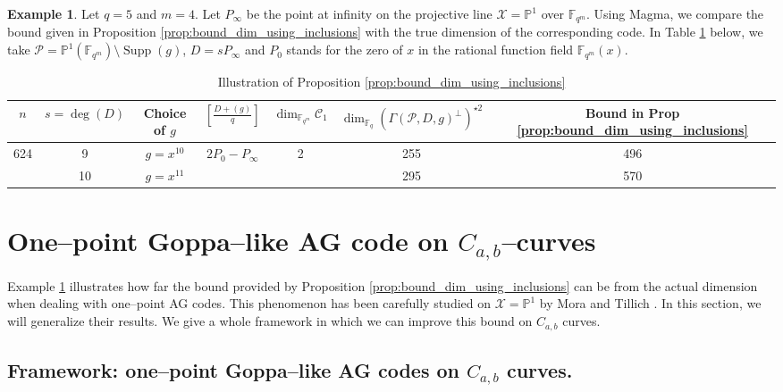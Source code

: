 \documentclass[a4paper]{amsart}
\theoremstyle{definition}
\newtheorem{example}[thm]{Example}
\theoremstyle{remark}
\newcommand{\calP}{\mathcal{P}}
\newcommand{\calC}{\mathcal{C}}
\newcommand{\calX}{\mathcal{X}}
\newcommand{\fqm}{\mathbb{F}_{q^m}}
\newcommand{\fq}{\mathbb{F}_{q}}
\newcommand{\PP}{\mathbb{P}}
\newcommand{\Supp}{\operatorname{Supp}}
\begin{document}
\begin{example} \label{ex:non_equality_bound}
Let $q=5$ and $m=4$. Let $P_\infty$ be the point at infinity on the projective line $\calX=\PP^1$ over $\fqm$. Using Magma, we compare the bound given in Proposition \ref{prop:bound_dim_using_inclusions} with the true dimension of the corresponding code. In Table \ref{table:example2} below, we take $\calP = \PP^1(\fqm) \setminus \Supp(g)$, $D = sP_\infty$ and $P_0$ stands for the zero of $x$ in the rational function field $\fqm(x)$.
\begin{table}[h]
	\begin{center}
		\begin{tabular}{|c|c|c|c|c|c|c|}
			\hline
			$n$&  $s = \deg(D)$ & Choice of $g$ & $\left[ \frac{D+(g)}{q} \right]$ & $\dim_{\fqm} \calC_1$  & $\dim_{\fq} (\Gamma(\calP,D,g)^{\perp})^{\star 2}$ & Bound in Prop \ref{prop:bound_dim_using_inclusions}\\
			\hline \hline
			\multirow{2}{*}{624} & 9 & $g = x^{10}$ & \multirow{2}{*}{$2P_0-P_\infty$} & \multirow{2}{*}{2} & 255 & 496\\
			\cline{2-3}	\cline{6-7}
								 & 10 & $g = x^{11}$& 						& 					& 295 & 570\\ 
			\hline
		\end{tabular}
		\vspace*{0.3em}
		\caption{Illustration of Proposition \ref{prop:bound_dim_using_inclusions}} \label{table:example2}
	\end{center}
\end{table}
\end{example}



\section{One--point Goppa--like AG code on $C_{a,b}$--curves}\label{sec:AG-C_a,b}

Example \ref{ex:non_equality_bound} illustrates how far the bound provided by Proposition \ref{prop:bound_dim_using_inclusions} can be from the actual dimension when dealing with one--point AG codes. This phenomenon has been carefully studied on $\calX=\PP^1$ by Mora and Tillich \cite{MT21}. In this section, we will generalize their results. We give a whole framework in which we can improve this bound on $C_{a,b}$ curves. 

\subsection{Framework: one--point Goppa--like AG codes on $C_{a,b}$ curves.}
\end{document}
